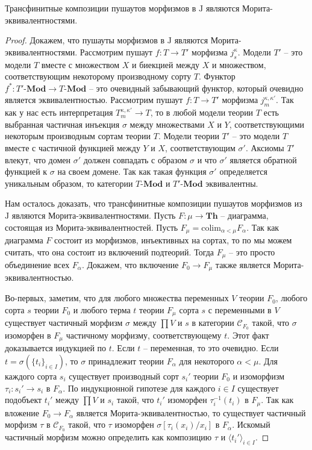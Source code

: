 \documentclass[reqno]{amsart}
\theoremstyle{definition}
\theoremstyle{remark}
\newcommand{\bcat}[1]{\mathbf{#1}}
\newcommand{\cat}[1]{\mathcal{#1}}
\newcommand{\Mod}[1]{#1\text{-}\bcat{Mod}}
\newcommand{\fs}[1]{\mathrm{#1}}
\newcommand{\Th}{\bcat{Th}}
\newcommand{\colim}{\fs{colim}}
\newcommand{\J}{\mathrm{J}}
\begin{document}
\begin{lem}
Трансфинитные композиции пушаутов морфизмов в $\J$ являются Морита-эквивалентностями.
\end{lem}
\begin{proof}
Докажем, что пушауты морфизмов в $\J$ являются Морита-эквивалентностями.
Рассмотрим пушаут $f : T \to T'$ морфизма $j^\kappa_s$.
Модели $T'$ -- это модели $T$ вместе с множеством $X$ и биекцией между $X$ и множеством, соответствующим некоторому производному сорту $T$.
Функтор $f^* : \Mod{T'} \to \Mod{T}$ -- это очевидный забывающий функтор, который очевидно является эквивалентностью.
Рассмотрим пушаут $f : T \to T'$ морфизма $j^{\kappa,\kappa'}_m$.
Так как у нас есть интерпретация $T_m^{\kappa,\kappa'} \to T$, то в любой модели теории $T$ есть выбранная частичная инъекция $\sigma$ между множествами $X$ и $Y$, соответствующими некоторым производным сортам теории $T$.
Модели теории $T'$ -- это модели $T$ вместе с частичной функцией между $Y$ и $X$, соответствующим $\sigma'$.
Аксиомы $T'$ влекут, что домен $\sigma'$ должен совпадать с образом $\sigma$ и что $\sigma'$ является обратной функцией к $\sigma$ на своем домене.
Так как такая функция $\sigma'$ определяется уникальным образом, то категории $\Mod{T}$ и $\Mod{T'}$ эквивалентны.

Нам осталось доказать, что трансфинитные композиции пушаутов морфизмов из $\J$ являются Морита-эквивалентностями.
Пусть $F : \mu \to \Th$ -- диаграмма, состоящая из Морита-эквивалентностей.
Пусть $F_\mu = \colim_{\alpha < \mu} F_\alpha$.
Так как диаграмма $F$ состоит из морфизмов, инъективных на сортах, то по  мы можем считать, что она состоит из включений подтеорий.
Тогда $F_\mu$ -- это просто объединение всех $F_\alpha$.
Докажем, что включение $F_0 \to F_\mu$ также является Морита-эквивалентностью.

Во-первых, заметим, что для любого множества переменных $V$ теории $F_0$, любого сорта $s$ теории $F_0$ и любого терма $t$ теории $F_\mu$ сорта $s$ с переменными в $V$
существует частичный морфизм $\sigma$ между $\prod V$ и $s$ в категории $\cat{C}_{F_0}$ такой, что $\sigma$ изоморфен в $F_\mu$ частичному морфизму, соответствующему $t$.
Этот факт доказывается индукцией по $t$.
Если $t$ -- переменная, то это очевидно.
Если $t = \sigma(\{ t_i \}_{i \in I})$, то $\sigma$ принадлежит теории $F_\alpha$ для некоторого $\alpha < \mu$.
Для каждого сорта $s_i$ существует производный сорт $s_i'$ теории $F_0$ и изоморфизм $\tau_i : s_i' \to s_i$ в $F_\alpha$.
По индукционной гипотезе для каждого $i \in I$ существует подобъект $t_i'$ между $\prod V$ и $s_i$ такой, что $t_i'$ изоморфен $\tau_i^{-1}(t_i)$ в $F_\mu$.
Так как вложение $F_0 \to F_\alpha$ является Морита-эквивалентностью, то существует частичный морфизм $\tau$ в $\cat{C}_{F_0}$ такой, что $\tau$ изоморфен $\sigma[\tau_i(x_i)/x_i]$ в $F_\alpha$.
Искомый частичный морфизм можно определить как композицию $\tau$ и $\langle t_i' \rangle_{i \in I}$.


\end{proof}
\end{document}
